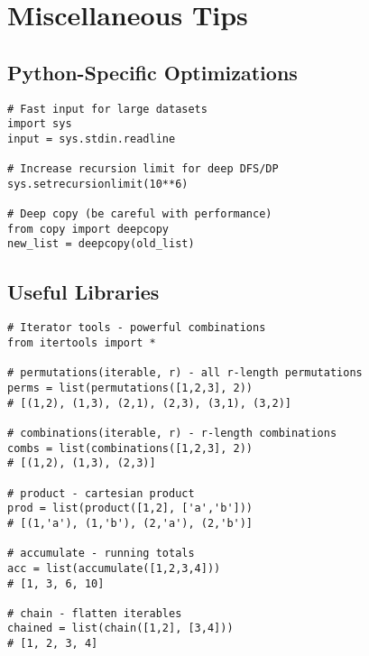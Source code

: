 \section{Miscellaneous Tips}

\subsection{Python-Specific Optimizations}
\begin{lstlisting}
# Fast input for large datasets
import sys
input = sys.stdin.readline

# Increase recursion limit for deep DFS/DP
sys.setrecursionlimit(10**6)

# Deep copy (be careful with performance)
from copy import deepcopy
new_list = deepcopy(old_list)
\end{lstlisting}

\subsection{Useful Libraries}
\begin{lstlisting}
# Iterator tools - powerful combinations
from itertools import *

# permutations(iterable, r) - all r-length permutations
perms = list(permutations([1,2,3], 2))
# [(1,2), (1,3), (2,1), (2,3), (3,1), (3,2)]

# combinations(iterable, r) - r-length combinations
combs = list(combinations([1,2,3], 2))
# [(1,2), (1,3), (2,3)]

# product - cartesian product
prod = list(product([1,2], ['a','b']))
# [(1,'a'), (1,'b'), (2,'a'), (2,'b')]

# accumulate - running totals
acc = list(accumulate([1,2,3,4]))
# [1, 3, 6, 10]

# chain - flatten iterables
chained = list(chain([1,2], [3,4]))
# [1, 2, 3, 4]
\end{lstlisting}

